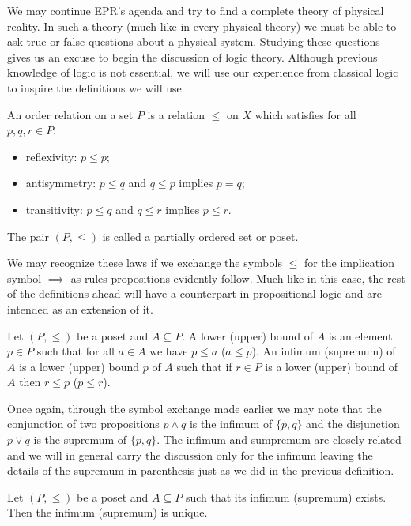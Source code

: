 We may continue EPR's agenda and try to find a complete theory of physical reality. In such a theory (much like in every physical theory) we must be able to ask true or false questions about a physical system. Studying these questions gives us an excuse to begin the discussion of logic theory. Although previous knowledge of logic is not essential, we will use our experience from classical logic to inspire the definitions we will use.

\begin{definition}
An order relation on a set $P$ is a relation $\leq$ on $X$ which satisfies for all $p,q,r\in P$:
\begin{itemize}
\item reflexivity: $p\leq p$;
\item antisymmetry: $p\leq q$ and $q\leq p$ implies $p=q$;
\item transitivity: $p\leq q$ and $q\leq r$ implies $p\leq r$.
\end{itemize}
The pair $(P,\leq)$ is called a partially ordered set or poset.
\end{definition}

We may recognize these laws if we exchange the symbols $\leq$ for the implication symbol $\implies$ as rules propositions evidently follow. Much like in this case, the rest of the definitions ahead will have a counterpart in propositional logic and are intended as an extension of it.   

\begin{definition}
Let $(P,\leq)$ be a poset and $A\subseteq P$. A lower (upper) bound of $A$ is an element $p\in P$ such that for all $a \in A$ we have $p\leq a$ ($a\leq p$). An infimum (supremum) of $A$ is a lower (upper) bound $p$ of $A$ such that if $r\in P$ is a lower (upper) bound of $A$ then $r\leq p$ ($p\leq r$).     
\end{definition}

Once again, through the symbol exchange made earlier we may note that the conjunction of two propositions $p\wedge q$ is the infimum of $\{p,q\}$ and the disjunction $p\vee q$ is the supremum of $\{p,q\}$. The infimum and sumpremum are closely related and we will in general carry the discussion only for the infimum leaving the details of the supremum in parenthesis just as we did in the previous definition. 

\begin{theorem}
Let $(P,\leq)$ be a poset and $A\subseteq P$ such that its infimum (supremum) exists. Then the infimum (supremum) is unique. 
\end{theorem}

